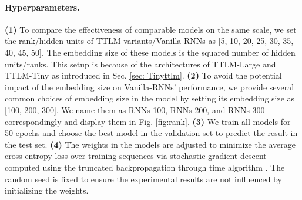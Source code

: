 




\paragraph{Hyperparameters.} \textbf{(1)} To compare the effectiveness of comparable models on the same scale, we set the rank/hidden units of TTLM variants/Vanilla-RNNs as [5, 10, 20, 25, 30, 35, 40, 45, 50]. The embedding size of these models is the squared number of hidden units/ranks. This setup is because of the architectures of TTLM-Large and TTLM-Tiny as introduced in Sec. \ref{sec: Tinyttlm}. \textbf{(2)}  To avoid the potential impact of the embedding size on Vanilla-RNNs' performance, we provide several common choices of embedding size in the model by setting its embedding size as [100, 200, 300]. We name them as RNNs-100, RNNs-200, and RNNs-300 correspondingly and display them in Fig. \ref{fig:rank}. \textbf{(3)}  We train all models for 50 epochs and choose the best model in the validation set to predict the result in the test set. \textbf{(4)}   The weights in the models are adjusted to minimize the average cross entropy loss over training sequences via stochastic gradient descent computed using the truncated backpropagation through time algorithm \citep{werbos1990backpropagation,williams1990efficient}.  The random seed is fixed to ensure the experimental results are not influenced by initializing the weights.

